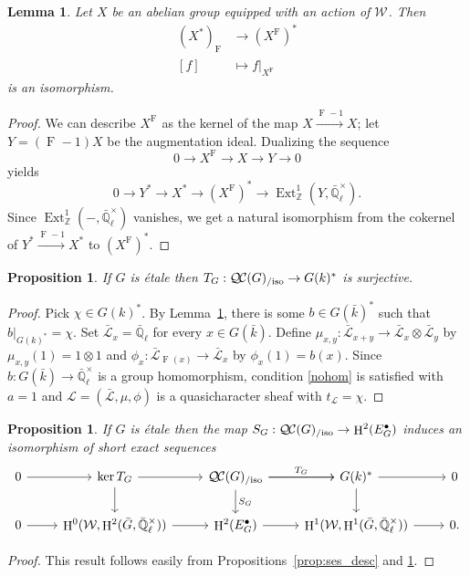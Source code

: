\documentclass{amsart}
\theoremstyle{plain}
\newtheorem{proposition}[theorem]{Proposition}
\newtheorem{lemma}[theorem]{Lemma}
\theoremstyle{definition}
\theoremstyle{remark}
\newcommand{\ZZ}{{\mathbb{Z}}}
\newcommand{\EE}{\mathbb{\bar Q}_\ell}
\newcommand{\bFq}{\bar{k}}
\newcommand{\Fq}{k}
\newcommand{\EEx}{\EE^\times}
\newcommand{\Weil}[1]{\mathcal{W}_{#1}}
\newcommand{\Frob}[1]{\operatorname{F}_{#1}}
\DeclareMathOperator{\Ext}{Ext}
\DeclareMathOperator{\Hh}{H}
\newcommand{\trFrob}[1]{t_{#1}}
\newcommand{\TrFrob}[1]{T_{#1}}
\newcommand{\qcs}[1]{{\mathcal{#1}}}
\newcommand{\gqcs}[1]{{\mathcal{\bar #1}}}
\newcommand{\QC}{{\mathcal{Q\hskip-0.8pt C}}}
\newcommand{\QCiso}[1]{\QC(#1)_{/\text{iso}}}
\begin{document}
\begin{lemma} \label{lem:dual-inv}
Let $X$ be an abelian group equipped with an action of $\Weil{}$.
 Then
\begin{align*}
 (X^*)_{\Frob{}} &\to (X^{\Frob{}})^* \\
 [f] &\mapsto f|_{X^{\Frob{}}}
\end{align*}
is an isomorphism.
\end{lemma}

\begin{proof}
We can describe $X^{\Frob{}}$ as the kernel of the map $X \xrightarrow{\Frob{}-1} X$;
let $Y = (\Frob{}-1)X$ be the augmentation ideal.  Dualizing the sequence
\[
 0 \to X^{\Frob{}} \to X \to Y \to 0
\]
yields
\[
 0 \to Y^* \to X^* \to (X^{\Frob{}})^* \to \Ext^1_\ZZ(Y, \EEx).
\]
Since $\Ext^1_\ZZ(-,\EEx)$ vanishes, we get a natural isomorphism from the cokernel of $Y^* \xrightarrow{\Frob{}-1} X^*$ to $(X^{\Frob{}})^*$.
\end{proof}

\begin{proposition}\label{prop:sur_etale}
If $G$ is \'etale then $\TrFrob{G} : \QCiso{G} \to G(\Fq)^*$ is surjective.
\end{proposition}
\begin{proof}
Pick $\chi \in G(\Fq)^*$.
By Lemma~\ref{lem:dual-inv}, there is some $b\in G(\bFq)^*$ such that $b\vert_{G(\Fq)^*} = \chi$.
Set $\gqcs{L}_x = \EE$ for every $x\in G(\bFq)$.
Define $\mu_{x,y} : \gqcs{L}_{x+y} \to \gqcs{L}_x\otimes \gqcs{L}_y$ by $\mu_{x,y}(1) = 1 \otimes 1$ and
$\phi_{x} : \gqcs{L}_{\Frob{}(x)} \to \gqcs{L}_x$ by $\phi_{x}(1) = b(x)$.
Since $b : G(\bFq) \to \EEx$ is a group homomorphism,
condition \eqref{nohom} is satisfied with $a =1$ and $\qcs{L} = (\gqcs{L}, \mu, \phi)$
is a quasicharacter sheaf with $\trFrob{\qcs{L}} = \chi$.
\end{proof}

\begin{proposition} \label{prop:etale-iso}
 If $G$ is \'etale then the map $S_G : \QCiso{G}\to \Hh^2(E^\bullet_G)$ induces an isomorphism of short exact sequences
\[
\begin{tikzcd}
 0 \arrow{r} & \ker \TrFrob{G} \arrow{d} \arrow{r} & \QCiso{G}\arrow{d}{S_G} \arrow{r}{\TrFrob{G}} \arrow{r} & G(\Fq)^* \arrow{d} \arrow{r} & 0\\
  0 \arrow{r} & \Hh^0(\Weil{},\Hh^2({\bar G},\EEx)) \arrow{r} & \Hh^2(E^\bullet_G) \arrow{r} & \Hh^1(\Weil{},\Hh^1({\bar G},\EEx)) \arrow{r} & 0.
 \end{tikzcd}
 \]
\end{proposition}
\begin{proof}
This result follows easily from Propositions~\ref{prop:ses_desc} and \ref{prop:sur_etale}.
\end{proof}
\end{document}
